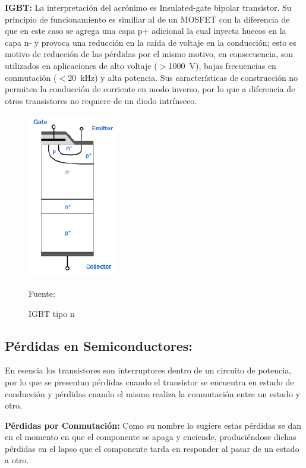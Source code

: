 \textbf{IGBT:} La interpretación del acrónimo es Insulated-gate bipolar transistor. Su principio de funcionamiento es similiar al de un MOSFET con la diferencia de que en este caso se agrega una capa p+ adicional la cual inyecta huecos en la capa n- y provoca una reducción en la caída de voltaje en la conducción; esto es motivo de reducción de las pérdidas por el mismo motivo, en consecuencia, son utilizados en aplicaciones de alto voltaje ($>$\SI{1000}{\volt}), bajas frecuencias en conmutación ($<$\SI{20}{\kilo\hertz}) y alta potencia. Sus características de construcción no permiten la conducción de corriente en modo inverso, por lo que a diferencia de otros transistores no requiere de un diodo intrínseco.\cite{beltran}

\begin{figure}[h]
\centering
\includegraphics[scale=0.9]{Figuras/igbt.png}
\caption{IGBT tipo n}
Fuente: \cite{beltran}
\label{igbt}
\end{figure}

\subsection{Pérdidas en Semiconductores:}

En esencia los transistores son interruptores dentro de un circuito de potencia, por lo que se presentan pérdidas cuando el transistor se encuentra en estado de conducción y pérdidas cuando el mismo realiza la conmutación entre un estado y otro.

\textbf{Pérdidas por Conmutación:} Como su nombre lo sugiere estas pérdidas se dan en el momento en que el componente se apaga y enciende, produciéndose dichas pérdidas en el lapso que el componente tarda en responder al pasar de un estado a otro.\cite{beltran} 

